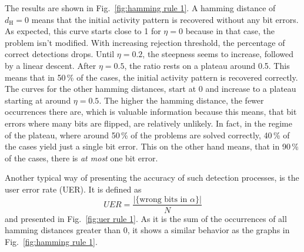 \documentclass{article}
\begin{document}
	The results are shown in Fig.~\ref{fig:hamming rule 1}. A hamming distance of $d_\text{H}=0$ means that the initial activity pattern is recovered without any bit errors. As expected, this curve starts close to 1 for $\eta=0$ because in that case, the problem isn't modified. With increasing rejection threshold, the percentage of correct detections drops. Until $\eta=0.2$, the steepness seems to increase, followed by a linear descent. After $\eta=0.5$, the ratio rests on a plateau around 0.5. This means that in 50\,\% of the cases, the initial activity pattern is recovered correctly. The curves for the other hamming distances, start at 0 and increase to a plateau starting at around $\eta=0.5$. The higher the hamming distance, the fewer occurrences there are, which is valuable information because this means, that bit errors where many bits are flipped, are relatively unlikely. In fact, in the regime of the plateau, where around 50\,\% of the problems are solved correctly, 40\,\% of the cases yield just a single bit error. This on the other hand means, that in 90\,\% of the cases, there is {\it at most} one bit error. 
	
	Another typical way of presenting the accuracy of such detection processes, is the user error rate (UER). It is defined as 
	\begin{equation}
		UER = \frac{|\{\text{wrong bits in $\alpha$}\}|}{N}
	\end{equation}
	and presented in Fig.~\ref{fig:uer rule 1}. As it is the sum of the occurrences of all hamming distances greater than 0, it shows a similar behavior as the graphs in Fig.~\ref{fig:hamming rule 1}. 
	
\end{document}
